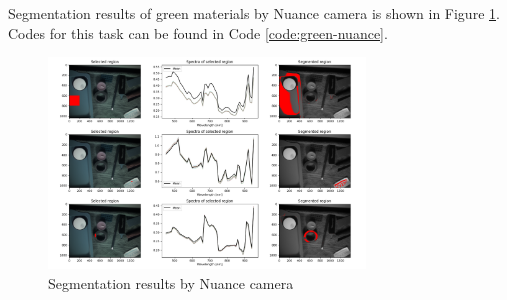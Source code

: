 Segmentation results of green materials by Nuance camera is shown in Figure \ref{fig:green-nuance}.
Codes for this task can be found in Code \ref{code:green-nuance}.

\begin{figure}[H]
    \centering
    \caption{Segmentation results by Nuance camera}
    \label{fig:green-nuance}
    \includegraphics[width=0.75\textwidth]{./fig/task1/nuance.png}
\end{figure}
